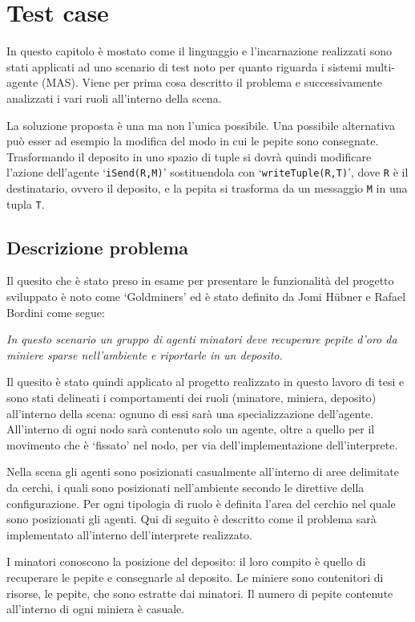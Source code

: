\chapter{Test case}\label{chap:validation}
In questo capitolo è mostato come il linguaggio e l'incarnazione realizzati sono stati applicati ad uno scenario di test noto per quanto riguarda i sistemi multi-agente (MAS).
Viene per prima cosa descritto il problema e successivamente analizzati i vari ruoli all'interno della scena.

La soluzione proposta è una ma non l'unica possibile. Una possibile alternativa può esser ad esempio la modifica del modo in cui le pepite sono consegnate. Trasformando il deposito in uno spazio di tuple si dovrà quindi modificare l'azione dell'agente `\texttt{iSend(R,M)}' sostituendola con `\texttt{writeTuple(R,T)}', dove \texttt{R} è il destinatario, ovvero il deposito, e la pepita si trasforma da un messaggio \texttt{M} in una tupla \texttt{T}.

\section{Descrizione problema}
Il quesito che è stato preso in esame per presentare le funzionalità del progetto sviluppato è noto come `Goldminers' ed è stato definito da Jomi H\"ubner e Rafael Bordini come segue:
%
\begin{center}
	\textit{In questo scenario un gruppo di agenti minatori deve recuperare pepite d'oro da miniere sparse nell'ambiente e riportarle in un deposito.}
\end{center}

Il quesito è stato quindi applicato al progetto realizzato in questo lavoro di tesi e sono stati delineati i comportamenti dei ruoli (minatore, miniera, deposito) all'interno della scena: ognuno di essi sarà una specializzazione dell'agente. All'interno di ogni nodo sarà contenuto solo un agente, oltre a quello per il movimento che è `fissato' nel nodo, per via dell'implementazione dell'interprete.

Nella scena gli agenti sono posizionati casualmente all'interno di aree delimitate da cerchi, i quali sono posizionati nell'ambiente secondo le direttive della configurazione. Per ogni tipologia di ruolo è definita l'area del cerchio nel quale sono posizionati gli agenti.
%
Qui di seguito è descritto come il problema sarà implementato all'interno dell'interprete realizzato.

I minatori conoscono la posizione del deposito: il loro compito è quello di recuperare le pepite e consegnarle al deposito.
Le miniere sono contenitori di risorse, le pepite, che sono estratte dai minatori. Il numero di pepite contenute all'interno di ogni miniera è casuale.

